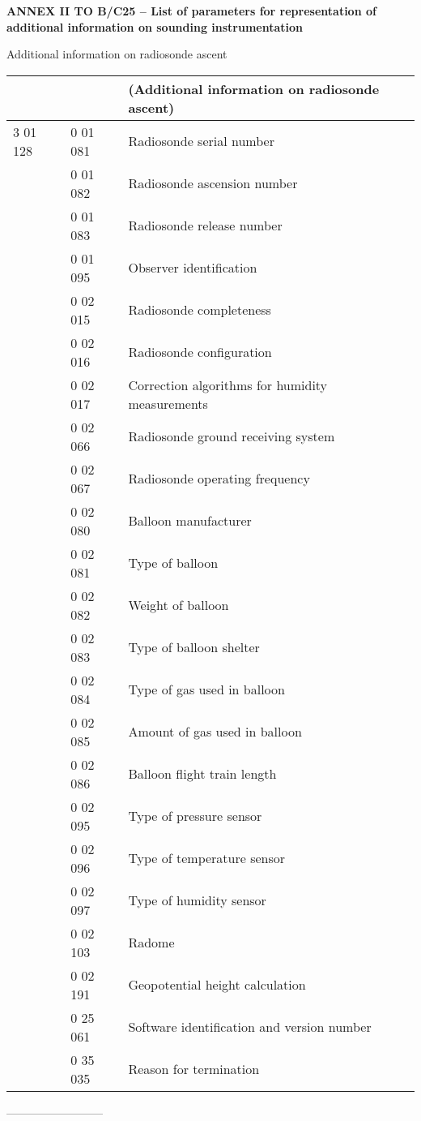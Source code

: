 \textbf{ANNEX II TO B/C25 -- List of parameters for representation of additional information on sounding instrumentation}

Additional information on radiosonde ascent

\begin{longtable}[]{@{}lll@{}}
\toprule
& & (Additional information on radiosonde ascent)\tabularnewline
\midrule
\endhead
3 01 128 & 0 01 081 & Radiosonde serial number\tabularnewline
& 0 01 082 & Radiosonde ascension number\tabularnewline
& 0 01 083 & Radiosonde release number\tabularnewline
& 0 01 095 & Observer identification\tabularnewline
& 0 02 015 & Radiosonde completeness\tabularnewline
& 0 02 016 & Radiosonde configuration\tabularnewline
& 0 02 017 & Correction algorithms for humidity measurements\tabularnewline
& 0 02 066 & Radiosonde ground receiving system\tabularnewline
& 0 02 067 & Radiosonde operating frequency\tabularnewline
& 0 02 080 & Balloon manufacturer\tabularnewline
& 0 02 081 & Type of balloon\tabularnewline
& 0 02 082 & Weight of balloon\tabularnewline
& 0 02 083 & Type of balloon shelter\tabularnewline
& 0 02 084 & Type of gas used in balloon\tabularnewline
& 0 02 085 & Amount of gas used in balloon\tabularnewline
& 0 02 086 & Balloon flight train length\tabularnewline
& 0 02 095 & Type of pressure sensor\tabularnewline
& 0 02 096 & Type of temperature sensor\tabularnewline
& 0 02 097 & Type of humidity sensor\tabularnewline
& 0 02 103 & Radome\tabularnewline
& 0 02 191 & Geopotential height calculation\tabularnewline
& 0 25 061 & Software identification and version number\tabularnewline
& 0 35 035 & Reason for termination\tabularnewline
\bottomrule
\end{longtable}

--------------------------
